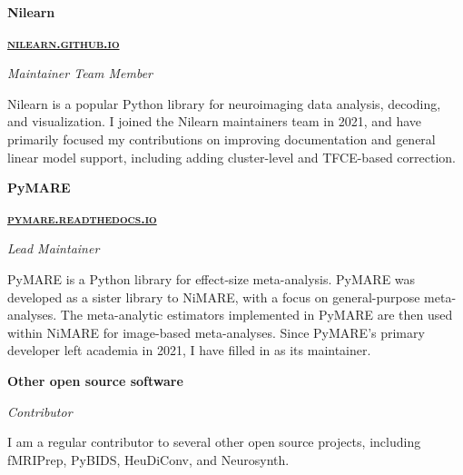 \documentclass[10pt]{article}
\newcommand{\shorturl}[1]{\href{https://#1}{\textsc{#1}}}
\begin{document}
\bigskip

\begin{samepage}
\begin{minipage}[t]{.5\linewidth}
	\flushleft
	\noindent
	\textbf{Nilearn}
\end{minipage}
\hfill
\begin{minipage}[t]{.5\linewidth}
	\flushright
	\noindent
	\textbf{\shorturl{nilearn.github.io}}
\end{minipage}
\nopagebreak
\emph{Maintainer Team Member}
\nopagebreak
\begin{adjustwidth}{2em}{0em}
	Nilearn is a popular Python library for neuroimaging data analysis, decoding, and visualization.
	I joined the Nilearn maintainers team in 2021, and have primarily focused my contributions on improving
	documentation and general linear model support, including adding cluster-level and TFCE-based correction.
\end{adjustwidth}
\end{samepage}

\bigskip

\begin{samepage}
\begin{minipage}[t]{.5\linewidth}
	\flushleft
	\noindent
	\textbf{PyMARE}
\end{minipage}
\hfill
\begin{minipage}[t]{.5\linewidth}
	\flushright
	\noindent
	\textbf{\shorturl{pymare.readthedocs.io}}
\end{minipage}
\nopagebreak
\emph{Lead Maintainer}
\nopagebreak
\begin{adjustwidth}{2em}{0em}
	PyMARE is a Python library for effect-size meta-analysis.
	PyMARE was developed as a sister library to NiMARE, with a focus on general-purpose meta-analyses.
	The meta-analytic estimators implemented in PyMARE are then used within NiMARE for image-based meta-analyses.
	Since PyMARE's primary developer left academia in 2021, I have filled in as its maintainer.
\end{adjustwidth}
\end{samepage}

\bigskip

\begin{samepage}
\begin{minipage}[t]{.5\linewidth}
	\flushleft
	\noindent
	\textbf{Other open source software}
\end{minipage}
\hfill
\nopagebreak
\emph{Contributor}
\nopagebreak
\begin{adjustwidth}{2em}{0em}
	I am a regular contributor to several other open source projects, including fMRIPrep, PyBIDS, HeuDiConv, and Neurosynth.
\end{adjustwidth}
\end{samepage}
\end{document}

